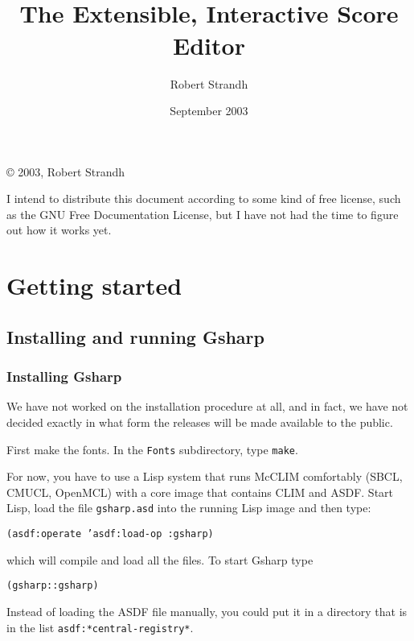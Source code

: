 \documentclass[11pt]{book}
\title{{\Huge {\gs}}\\{\huge The Extensible, Interactive Score Editor}}
\author{{\Large Robert Strandh}}
\date{September 2003}
\def\gs{Gsharp}
\def\clim{CLIM}
\def\lisp{Lisp}
\def\inputtex#1{}
\begin{document}

\maketitle

\newpage

\vspace*{\fill}
\copyright{} 2003, Robert Strandh

I intend to distribute this document according to some kind of free
license, such as the GNU Free Documentation License, but I have not
had the time to figure out how it works yet. 

\newpage

{\setlength{\parskip}{0cm}
\tableofcontents}

\inputtex{intro.tex}

\part{Getting started}

\chapter{Installing and running {\gs}}

\section{Installing {\gs}}

We have not worked on the installation procedure at all, and in fact,
we have not decided exactly in what form the releases will be made
available to the public.  

First make the fonts.  In the \texttt{Fonts} subdirectory, type
\texttt{make}. 

For now, you have to use a Lisp system that runs McCLIM comfortably
(SBCL, CMUCL, OpenMCL) with a core image that contains {\clim} and
ASDF.  Start {\lisp}, load the file \texttt{gsharp.asd} into
the running {\lisp} image and then type:

\texttt{(asdf:operate 'asdf:load-op :gsharp)}

which will compile and load all the files. To start {\gs} type 

\texttt{(gsharp::gsharp)}

Instead of loading the ASDF file manually, you could put it in a
directory that is in the list \texttt{asdf:*central-registry*}. 
\end{document}

